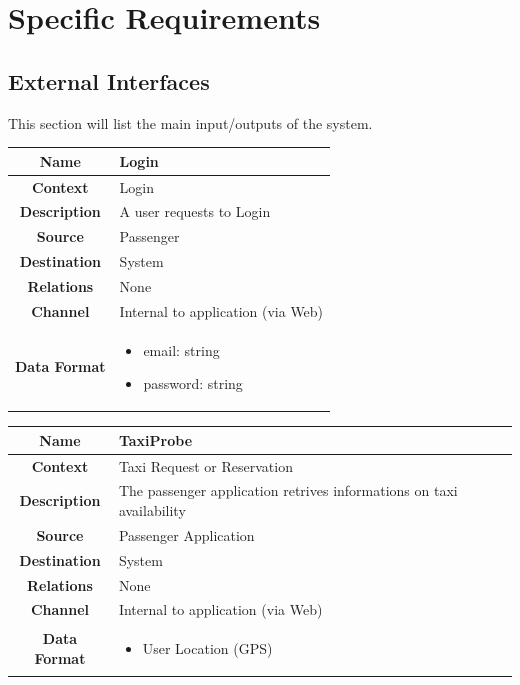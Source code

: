 \documentclass[11pt, a4paper,titlepage]{article}
\begin{document}
\section{Specific Requirements}
\subsection{External Interfaces} %
	This section will list the main input/outputs of the system. \newline
	\begin{tabularx}{\textwidth}{| c | X |}
		\hline
		\textbf{Name} & 
		Login
		\\
		\hline
		\textbf{Context} & 
		Login
		\\
		\hline
		\textbf{Description} & 
		A user requests to Login
		\\
		\hline
		\textbf{Source} &
		Passenger
		\\
		\hline
		\textbf{Destination} & 
		System
		\\
		\hline
		\textbf{Relations} & 
		None
		\\
		\hline
		\textbf{Channel} & 
		Internal to application (via Web)
		\\
		\hline
		\textbf{Data Format} & 
		\begin{itemize}
			\item email: string
			\item password: string
		\end{itemize}
		\\
		\hline		
	\end{tabularx}	
	\begin{tabularx}{\textwidth}{| c | X |}
		\hline
		\textbf{Name} & 
		TaxiProbe
		\\
		\hline
		\textbf{Context} & 
		Taxi Request or Reservation
		\\
		\hline
		\textbf{Description} & 
		The passenger application retrives informations on taxi availability
		\\
		\hline
		\textbf{Source} &
		Passenger Application
		\\
		\hline
		\textbf{Destination} & 
		System
		\\
		\hline
		\textbf{Relations} & 
		None
		\\
		\hline
		\textbf{Channel} & 
		Internal to application (via Web)
		\\
		\hline
		\textbf{Data Format} & 
		\begin{itemize}
			\item User Location (GPS)
		\end{itemize}
		\\
		\hline		
	\end{tabularx}
\end{document}
